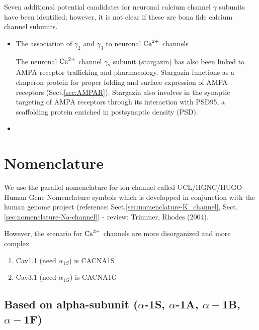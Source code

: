 Seven additional potential candidates for neuronal calcium channel $\gamma$
subunits have been identified; however, it is not clear if these are bona fide
calcium channel subunits.
\begin{itemize}
  \item The association of $\gamma_2$ and $\gamma_3$ to neuronal ${\text{Ca}^{2+}}$ channels
  \citep{kang2001, letts1998}

  The neuronal ${\text{Ca}^{2+}}$ channel $\gamma_2$ subunit (stargazin) has also been linked
  to AMPA receptor trafficking and pharmacology. Stargazin functions as a
  chaperon protein for proper folding and
surface expression of AMPA receptors (Sect.\ref{sec:AMPAR}).
Stargazin also involves
in the synaptic targeting of AMPA receptors through its interaction
with PSD95, a scaffolding protein enriched in postsynaptic
density (PSD).
  
\item 
\end{itemize}


\section{Nomenclature}
\label{sec:nomenclature-Cav-channels}

We use the parallel nomenclature for ion channel called UCL/HGNC/HUGO Human Gene
Nomenclature symbols which is developped in conjunction with the human genome
project (reference: Sect.\ref{sec:nomenclature-K_channel},
Sect.\ref{sec:nomenclature-Na-channel}) - review: Trimmer, Rhodes (2004).

However, the scenario for ${\text{Ca}^{2+}}$ channels are more disorganized and more complex
\begin{enumerate}
  \item Cav1.1 (need $\alpha_{1S}$) is CACNA1S
  
  \item Cav3.1 (need $\alpha_{1G}$) is CACNA1G
\end{enumerate}


\subsection{Based on alpha-subunit ($\alpha$-1S, $\alpha$-1A, $\alpha-$1B,
$\alpha-$1F)}
\label{sec:calcium-channel-classification-alpha-subunit}
\label{sec:alpha-subunit-Ca2+channel}

